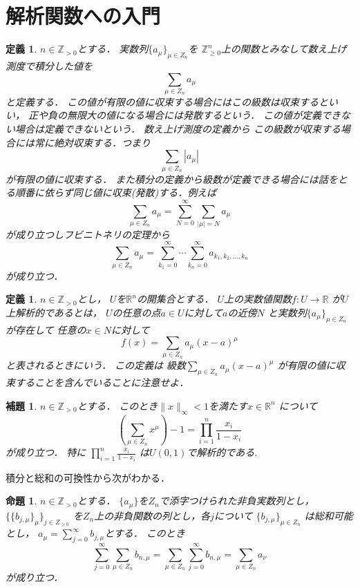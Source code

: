 \documentclass[leqno, a4paper, 12pt]{jsarticle}
\newtheorem{prop}[thm]{命題}
\newtheorem{lem}[thm]{補題}
\newtheorem{df}[thm]{定義}
\newcommand{\zz}{\mathbb{Z}}
\newcommand{\rr}{\mathbb{R}}
\begin{document}
\section{解析関数への入門}
\begin{df}
$n\in \zz_{>0}$とする．
実数列$\{a_{\mu}\}_{\mu\in Z_n}$を
$\zz_{\ge 0}^n$上の関数とみなして数え上げ測度で積分した値を
\[
\sum_{\mu\in Z_n}a_{\mu}
\]
と定義する．
この値が有限の値に収束する場合にはこの級数は収束するといい，
正や負の無限大の値になる場合には発散するという．
この値が定義できない場合は定義できないという．
数え上げ測度の定義から
この級数が収束する場合には常に絶対収束する．つまり
\[
\sum_{\mu\in Z_n}|a_{\mu}|
\]
が有限の値に収束する．
また積分の定義から級数が定義できる場合には話をとる順番に依らず同じ値に収束(発散)する．例えば
\[
\sum_{\mu\in Z_n}a_{\mu}=\sum_{N=0}^{\infty}\sum_{|\mu|=N}a_{\mu}
\]
が成り立つしフビニトネリの定理から
\[
\sum_{\mu\in Z_n}a_{\mu}=
\sum_{k_1=0}^{\infty}\cdots\sum_{k_n=0}^{\infty}
a_{k_1, k_2, \dots, k_n}
\]
が成り立つ．


\end{df}
\begin{df}
$n\in \zz_{>0}$とし，
$U$を$\rr^n$の開集合とする．
$U$上の実数値関数$f: U\to \rr$
が$U$上解析的であるとは，
$U$の任意の点$a\in U$に対して$a$の近傍$N$
と実数列$\{a_{\mu}\}_{\mu\in Z_n}$が存在して
任意の$x\in N$に対して
\[
f(x)=\sum_{\mu\in Z_n}a_{\mu}(x-a)^{\mu}
\]
と表されるときにいう．
この定義は
級数$\sum_{\mu\in Z_n}a_{\mu}(x-a)^{\mu}$
が有限の値に収束することを含んでいることに注意せよ．
\end{df}


\begin{lem}
$n\in \zz_{>0}$とする．
このとき$\|x\|_{\infty}<1$を満たす$x\in \rr^n$
について
\[
\left(\sum_{\mu\in Z_n}x^{\mu}\right)-1=\prod_{i=1}^n\frac{x_i}{1-x_i}
\]
が成り立つ．
特に
$\prod_{i=1}^n\frac{x_i}{1-x_i}$
は$U(0, 1)$で解析的である.


\end{lem}

積分と総和の可換性から次がわかる．

\begin{prop}
$n\in \zz_{>0}$とする．
$\{a_{\mu}\}$を$Z_n$で添字つけられた非負実数列とし，
$\{\{b_{j, \mu}\}_{\mu}\}_{j\in Z_{\ge 0}}$
を$Z_n$上の非負関数の列とし，各$j$について
$\{b_{j, \mu}\}_{\mu\in Z_n}$
は総和可能とし，
$a_{\mu}=\sum_{j=0}^{\infty}b_{j, \mu}$とする．
このとき
\[
\sum_{j=0}^{\infty}\sum_{\mu\in Z_n}b_{n, \mu}=
\sum_{\mu\in Z_n}\sum_{j=0}^{\infty}b_{n, \mu} =\sum_{\mu\in Z_n}a_{\nu}
\]
が成り立つ．
\end{prop}
\end{document}
